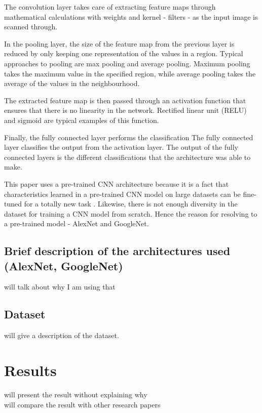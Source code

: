 \documentclass[conference]{IEEEtran}
\begin{document}
The convolution layer takes care of extracting feature maps through mathematical calculations with weights and kernel - filters - as the input image is scanned through. 

In the pooling layer, the size of the feature map from the previous layer is reduced by only keeping one representation of the values in a region. Typical approaches to pooling are max pooling and average pooling. Maximum pooling takes the maximum value in the specified region, while average pooling takes the average of the values in the neighbourhood.

The extracted feature map is then passed through an activation function that ensures that there is no linearity in the network. Rectified linear unit (RELU) and sigmoid are typical examples of this function.

Finally, the fully connected layer performs the classification 
The fully connected layer classifies the output from the activation layer. The output of the fully connected layers is the different classifications that the architecture was able to make.

This paper uses a pre-trained CNN architecture because it is a fact that characteristics learned in a pre-trained CNN model on large datasets can be fine-tuned for a totally new task \cite{}. Likewise, there is not enough diversity in the dataset for training a CNN model from scratch. Hence the reason for resolving to a pre-trained model - AlexNet and GoogleNet. 


\subsection{Brief description of the architectures used (AlexNet, GoogleNet)}
will talk about why I am using that

\subsection{Dataset}
will give a description of the dataset.\\




\section{Results}
will present the result without explaining why\\
will compare the result with other research papers\\
\end{document}
